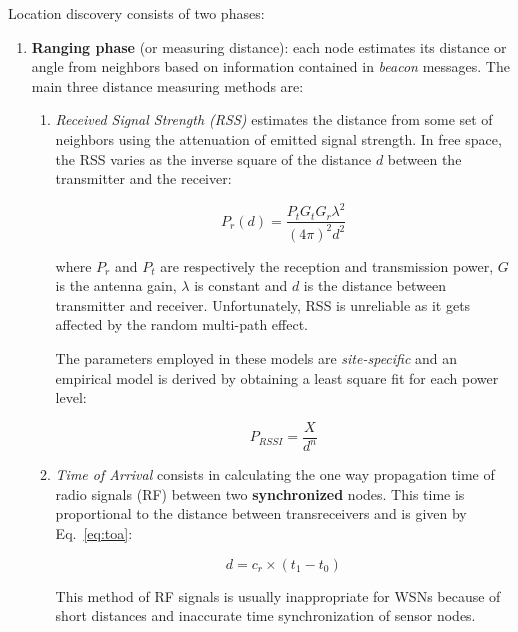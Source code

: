 \documentclass[a4paper,12pt]{article}
\begin{document}
Location discovery consists of two phases:
\begin{enumerate}
  \item \textbf{Ranging phase} (or measuring distance): each node estimates its distance or angle from neighbors based on information contained in \textit{beacon} messages.
  The main three distance measuring methods are: 

  \begin{enumerate}[label=(\roman*)]
    \item \textit{Received Signal Strength (RSS)} estimates the distance from some set of neighbors using the attenuation of emitted signal strength. In free space, the RSS varies as the inverse square of the distance $d$ between the transmitter and the receiver:

    \begin{equation}
    P_r(d) = \frac{P_t G_t G_r \lambda^2}{(4\pi)^2 d^2}
    \end{equation}

    where $ P_r $ and $ P_t $ are respectively the reception and transmission power, $ G $ is the antenna gain, $ \lambda $ is constant and $ d $ is the distance between transmitter and receiver. Unfortunately, RSS is unreliable as it gets affected by the random multi-path effect.

    The parameters employed in these models are \textit{site-specific} and an empirical model is derived by obtaining a least square fit for each power level:

    \begin{equation}
    P_{RSSI} = \frac{X}{d^n}
    \end{equation}

    \item \textit{Time of Arrival} consists in calculating the one way propagation time of radio signals (RF) between two \textbf{synchronized} nodes. This time is proportional to the distance between transreceivers and is given by Eq.~\ref{eq:toa}:

    \begin{equation}
    d = c_r \times (t_1 - t_0)
    \label{eq:toa}
    \end{equation}

    This method of RF signals is usually inappropriate for WSNs because of short distances and inaccurate time synchronization of sensor nodes.


\end{enumerate}
\end{enumerate}
\end{document}
